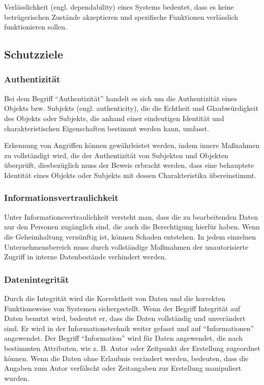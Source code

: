Verlässlichkeit (engl. dependability) eines Systems bedeutet, dass es keine betrügerischen Zustände akzeptieren und spezifische Funktionen verlässlich funktionieren sollen\cite[27]{eckert2013sicherheit}.

\subsection{Schutzziele}

\subsubsection{Authentizität}

Bei dem Begriff "`Authentizität"' handelt es sich um die Authentizität eines Objekts bzw. Subjekts (engl. authenticity), die die Echtheit und Glaubwürdigkeit des Objekts oder Subjekts, die anhand einer eindeutigen Identität und charakteristischen Eigenschaften bestimmt werden kann, umfasst\cite[28]{eckert2013sicherheit}.

Erkennung von Angriffen können gewährleistet werden, indem innere Maßnahmen zu vollständigt wird, die der Authentizität von Subjekten und Objekten überprüft\cite[13]{spies1985datenschutz}, diesbezüglich muss der Beweis erbracht werden, dass eine behauptete Identität eines Objekts oder Subjekts mit dessen Charakteristika übereinstimmt\cite[28]{eckert2013sicherheit}.

\subsubsection{Informationsvertraulichkeit}
Unter Informationsvertraulichkeit versteht man, dass die zu bearbeitenden Daten nur den Personen zugänglich sind, die auch die Berechtigung hierfür haben. Wenn die Geheimhaltung vernünftig ist, können Schaden entstehen. In jedem einzelnen Unternehmensbereich muss durch vollständige Maßmahmen der unautorisierte Zugriff in interne Datenbestände verhindert werden\cite[205]{gora2003handbuch}.

\subsubsection{Datenintegrität}

Durch die Integrität wird die Korrektheit von Daten und die korrekten Funktionsweise von Systemen sichergestellt. Wenn der Begriff Integrität auf Daten benutzt wird, bedeutet er, dass die Daten vollständig und unverändert sind. Er wird in der Informationstechnik weiter gefasst und auf "`Informationen"' angewendet. Der Begriff "`Information"' wird für Daten angewendet, die nach bestimmten Attributen, wie z. B. Autor oder Zeitpunkt der Erstellung zugeordnet können. Wenn die Daten ohne Erlaubnis verändert werden, bedeuten, dass die Angaben zum Autor verfälscht oder Zeitangaben zur Erstellung manipuliert wurden\cite{dtint2007}.

